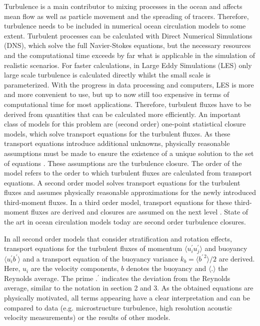 Turbulence is a main contributor to mixing processes in the ocean and affects 
mean flow as well as particle movement and the spreading of tracers. Therefore, 
turbulence needs to be included in numerical ocean circulation models to some 
extent. Turbulent processes can be calculated with Direct Numerical Simulations 
(DNS), which solve the full Navier-Stokes equations, but the necessary resources 
and the computational time exceeds by far what is applicable in the simulation 
of 
realistic scenarios. For faster calculations, in Large Eddy Simulations (LES) 
only large scale turbulence is calculated directly whilst the small scale is 
parameterized. With the progress in data processing and computers, LES is more 
and more convenient to use, but up to now still too expensive in terms of 
computational time for most 
applications. Therefore, turbulent fluxes have to be derived from quantities 
that can be calculated more efficiently. An important class of models for this 
problem are (second order) one-point statistical closure models, which solve 
transport equations for the turbulent fluxes. As these transport equations  
introduce additional unknowns, physically reasonable assumptions must be made 
to ensure the existence of a unique solution 
to the set of equations \citep[][]{UmlaufBurchard2005a}. These assumptions are 
the turbulence closure. The order of the model refers to the order to which 
turbulent fluxes are calculated from transport equations. A second order model 
solves transport equations for the turbulent fluxes and assumes physically 
reasonable approximations for the newly introduced third-moment fluxes. In a 
third order model, transport equations for these third-moment fluxes are derived 
and closures are assumed on the next level \citep[e.g. in][]{sander1998}. State 
of the art in ocean circulation models today are second order turbulence 
closures. 

In all second order models that consider stratification and rotation effects, 
transport equations for the turbulent fluxes of momentum $\langle u_i^\prime 
u_j^\prime \rangle$ and buoyancy $\langle 
u_i^\prime b^\prime \rangle$ and a transport equation of the buoyancy variance 
$k_b = \langle b^{\prime \, 2} \rangle \slash 2 $ are derived. Here, $u_i$ 
are the velocity components, $b$ denotes the buoyancy and $\langle . \rangle$ 
the Reynolds average. The prime $.^\prime$ indicates the deviation from the 
Reynolds average, similar to the notation in section 2 and 3. As the obtained 
equations are physically motivated, all terms appearing have a clear 
interpretation and can be compared to data (e.g. microstructure turbulence, high 
resolution acoustic velocity measurements) or the results of other models.  

